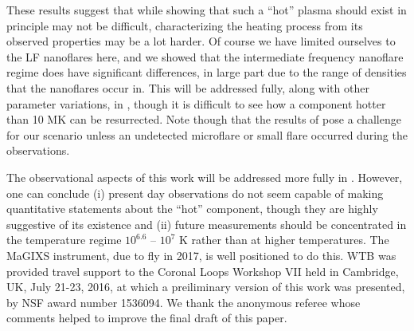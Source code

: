 \documentclass[]{aastex}
\begin{document}
%
\par These results suggest that while showing that such a ``hot'' plasma should exist in principle may not be difficult, characterizing the heating process from its observed properties may be a lot harder. Of course we have limited ourselves to the LF nanoflares here, and we showed \citep{cargill_active_2014} that the intermediate frequency nanoflare regime does have significant differences, in large part due to the range of densities that the nanoflares occur in. This will be addressed fully, along with other parameter variations, in , though it is difficult to see how a component hotter than 10 MK can be resurrected. Note though that the results of \citet{caspi_new_2015} pose a challenge for our scenario unless an undetected microflare or small flare occurred during the observations.
	
	\par The observational aspects of this work will be addressed more fully in . However, one can conclude (i) present day observations do not seem capable of making quantitative statements about the ``hot'' component, though they are highly suggestive of its existence and (ii) future measurements should be concentrated in the temperature regime $10^{6.6}$ – $10^7$ K rather than at higher temperatures. The MaGIXS instrument, due to fly in 2017, is well positioned to do this.
\acknowledgments
WTB was provided travel support to the Coronal Loops Workshop
VII held in Cambridge, UK, July 21-23, 2016, at which a preiliminary version of this work was presented, by NSF award number 1536094. We thank the anonymous referee whose comments helped to improve the final draft of this paper.
	
	\appendix
\end{document}
